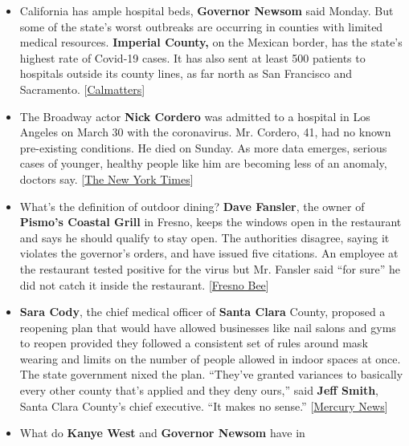 \begin{itemize}
\item
  California has ample hospital beds, \textbf{Governor Newsom} said
  Monday. But some of the state's worst outbreaks are occurring in
  counties with limited medical resources. \textbf{Imperial County,} on
  the Mexican border, has the state's highest rate of Covid-19 cases. It
  has also sent at least 500 patients to hospitals outside its county
  lines, as far north as San Francisco and Sacramento.
  {[}\href{https://calmatters.org/health/coronavirus/2020/07/imperial-county-covid-coronavirus-icu-beds/}{Calmatters}{]}
\item
  The Broadway actor \textbf{Nick Cordero} was admitted to a hospital in
  Los Angeles on March 30 with the coronavirus. Mr. Cordero, 41, had no
  known pre-existing conditions. He died on Sunday. As more data
  emerges, serious cases of younger, healthy people like him are
  becoming less of an anomaly, doctors say.
  {[}\href{https://www.nytimes.com/2020/07/06/health/coronavirus-nick-cordero-underlying-conditions.html?action=click\&module=Top\%20Stories\&pgtype=Homepage}{The
  New York Times}{]}
\item
  What's the definition of outdoor dining? \textbf{Dave Fansler}, the
  owner of \textbf{Pismo's Coastal Grill} in Fresno, keeps the windows
  open in the restaurant and says he should qualify to stay open. The
  authorities disagree, saying it violates the governor's orders, and
  have issued five citations. An employee at the restaurant tested
  positive for the virus but Mr. Fansler said ``for sure'' he did not
  catch it inside the restaurant.
  {[}\href{https://www.fresnobee.com/article244028307.html}{Fresno
  Bee}{]}
\item
  \textbf{Sara Cody}, the chief medical officer of \textbf{Santa Clara}
  County, proposed a reopening plan that would have allowed businesses
  like nail salons and gyms to reopen provided they followed a
  consistent set of rules around mask wearing and limits on the number
  of people allowed in indoor spaces at once. The state government nixed
  the plan. ``They've granted variances to basically every other county
  that's applied and they deny ours,'' said \textbf{Jeff Smith}, Santa
  Clara County's chief executive. ``It makes no sense.''
  {[}\href{https://www.mercurynews.com/2020/07/04/california-denies-santa-clara-countys-expanded-reopening-plan-confusion-grows-on-outdoor-dining/}{Mercury
  News}{]}
\item
  What do \textbf{Kanye West} and \textbf{Governor Newsom} have in

\end{itemize}
